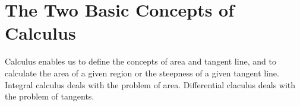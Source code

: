\section{The Two Basic Concepts of Calculus}\label{0:sec:1.1}

\begin{note}
  Calculus enables us to define the concepts of area and tangent line, and to calculate the area of a given region or the steepness of a given tangent line.
  Integral calculus deals with the problem of area.
  Differential claculus deals with the problem of tangents.
\end{note}
